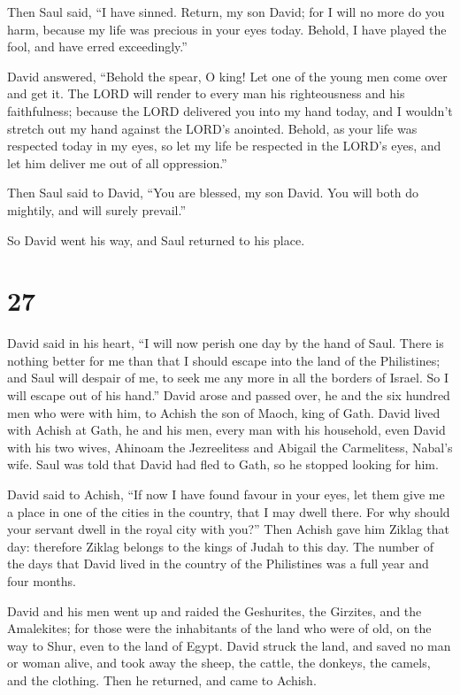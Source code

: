  Then Saul said, ``I have sinned. Return, my son David; for
I will no more do you harm, because my life was precious in your eyes
today. Behold, I have played the fool, and have erred exceedingly.''

 David answered, ``Behold the spear, O king! Let one of the
young men come over and get it.  The LORD will render to
every man his righteousness and his faithfulness; because the LORD
delivered you into my hand today, and I wouldn't stretch out my hand
against the LORD's anointed.  Behold, as your life was
respected today in my eyes, so let my life be respected in the LORD's
eyes, and let him deliver me out of all oppression.''

 Then Saul said to David, ``You are blessed, my son David.
You will both do mightily, and will surely prevail.''

So David went his way, and Saul returned to his place.

\hypertarget{section-26}{%
\section{27}\label{section-26}}

 David said in his heart, ``I will now perish one day by the
hand of Saul. There is nothing better for me than that I should escape
into the land of the Philistines; and Saul will despair of me, to seek
me any more in all the borders of Israel. So I will escape out of his
hand.''  David arose and passed over, he and the six hundred
men who were with him, to Achish the son of Maoch, king of Gath.
 David lived with Achish at Gath, he and his men, every man
with his household, even David with his two wives, Ahinoam the
Jezreelitess and Abigail the Carmelitess, Nabal's wife. 
Saul was told that David had fled to Gath, so he stopped looking for
him.

 David said to Achish, ``If now I have found favour in your
eyes, let them give me a place in one of the cities in the country, that
I may dwell there. For why should your servant dwell in the royal city
with you?''  Then Achish gave him Ziklag that day: therefore
Ziklag belongs to the kings of Judah to this day.  The
number of the days that David lived in the country of the Philistines
was a full year and four months.

 David and his men went up and raided the Geshurites, the
Girzites, and the Amalekites; for those were the inhabitants of the land
who were of old, on the way to Shur, even to the land of Egypt.
 David struck the land, and saved no man or woman alive, and
took away the sheep, the cattle, the donkeys, the camels, and the
clothing. Then he returned, and came to Achish.

